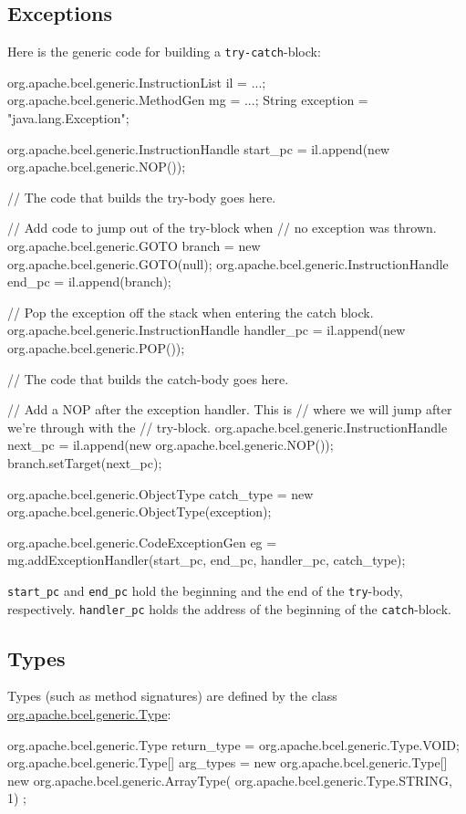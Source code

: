 \subsection{Exceptions}
Here is the generic code for building a {\tt try-catch}-block:
\begin{listing}{1}
   org.apache.bcel.generic.InstructionList il = ...;
   org.apache.bcel.generic.MethodGen mg = ...;
   String exception = "java.lang.Exception";

   org.apache.bcel.generic.InstructionHandle start_pc =
      il.append(new org.apache.bcel.generic.NOP());

   // The code that builds the try-body goes here.

   // Add code to jump out of the try-block when
   // no exception was thrown.
   org.apache.bcel.generic.GOTO branch = 
      new org.apache.bcel.generic.GOTO(null);
   org.apache.bcel.generic.InstructionHandle end_pc =
        il.append(branch);

   // Pop the exception off the stack when entering the catch block.
   org.apache.bcel.generic.InstructionHandle handler_pc =
       il.append(new org.apache.bcel.generic.POP());

   // The code that builds the catch-body goes here.

   // Add a NOP after the exception handler. This is 
   // where we will jump after we're through with the
   // try-block.
   org.apache.bcel.generic.InstructionHandle next_pc =
       il.append(new org.apache.bcel.generic.NOP());
   branch.setTarget(next_pc);

   org.apache.bcel.generic.ObjectType catch_type =
      new org.apache.bcel.generic.ObjectType(exception);

   org.apache.bcel.generic.CodeExceptionGen eg =
      mg.addExceptionHandler(start_pc, end_pc, handler_pc, catch_type);
\end{listing}
{\tt start\_pc} and {\tt end\_pc} hold the beginning and the
end of the {\tt try}-body, respectively. {\tt handler\_pc}
holds the address of the beginning of the {\tt catch}-block.

\subsection{Types}
Types (such as method signatures) are defined by the
class \url{org.apache.bcel.generic.Type}:
\begin{listing}{1}
   org.apache.bcel.generic.Type return_type = 
      org.apache.bcel.generic.Type.VOID;
   org.apache.bcel.generic.Type[] arg_types   = 
      new org.apache.bcel.generic.Type[] { 
         new org.apache.bcel.generic.ArrayType(
            org.apache.bcel.generic.Type.STRING, 1)
      };
\end{listing}

